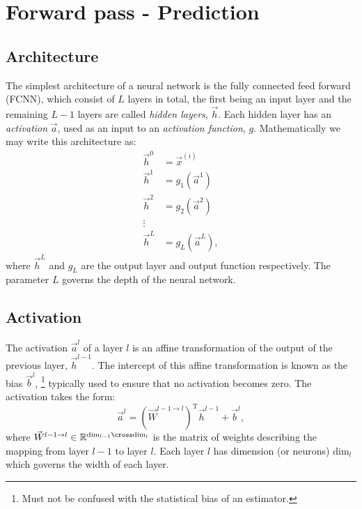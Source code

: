 %
%

\section{Forward pass - Prediction}
    \subsection{Architecture}
        The simplest architecture of a neural network is the fully connected feed forward (FCNN), which consist of $L$ layers in total, the first being an input layer and the remaining $L-1$ layers are called \textit{hidden layers}, $\vec{h}$. Each hidden layer has an \textit{activation} $\vec{a}$, used as an input to an \textit{activation function}, $g$. Mathematically we may write this architecture as:
        \begin{equation}
            \begin{split}
                \vec{h}^0 &= \vec{x}^{(i)} \\
                \vec{h}^1 &= g_1(\vec{a}^1) \\
                \vec{h}^2 &= g_2(\vec{a}^2) \\
                \vdots & \\
                \vec{h}^{L} &= g_L(\vec{a}^L),
            \end{split}
        \end{equation}
        where $\vec{h}^L$ and $g_L$ are the output layer and output function respectively. The parameter $L$ governs the depth of the neural network. 
    \subsection{Activation}
        The activation $\vec{a}^l$ of a layer $l$ is an affine transformation of the output of the previous layer, $\vec{h}^{l-1}$. The intercept of this affine transformation is known as the bias $\vec{b}^l$, \footnote{Must not be confused with the statistical bias of an estimator.} typically used to ensure that no activation becomes zero. The activation takes the form:
        \begin{equation}
            \vec{a}^l = (\vec{W}^{l-1\to l})^\mathrm{T}\vec{h}^{l-1} + \vec{b}^l,
        \end{equation}
        where $\vec{W}^{l-1\to l} \in \mathbb{R}^{\mathrm{dim}_{l-1}\cross\mathrm{dim}_l}$ is the matrix of weights describing the mapping from layer $l-1$ to layer $l$. Each layer $l$ has dimension (or neurons) $\mathrm{dim}_l$ which governs the width of each layer. 


